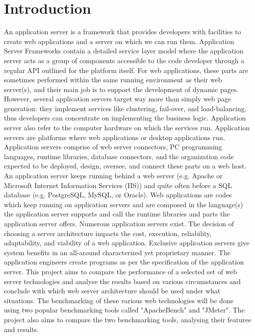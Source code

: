 \documentclass[../thesis.tex]{subfiles}
\begin{document}
\section{Introduction}

\vspace{5mm}
An application server is a framework that provides developers with facilities to create web applications and a server on which we can run them. Application Server Frameworks contain a detailed service layer model where the application server acts as a group of components accessible to the code developer through a regular API outlined for the platform itself. For web applications, these parts are sometimes performed within the same running environment as their web server(s), and their main job is to support the development of dynamic pages. However, several application servers target way more than simply web page generation: they implement services like clustering, fail-over, and load-balancing, thus developers can concentrate on implementing the business logic.
Application server also refer to the computer hardware on which the services run.
\vspace{5mm}
Application servers are platforms where web applications or desktop applications run. Application servers comprise of web server connectors, PC programming languages, runtime libraries, database connectors, and the organization code expected to be deployed, design, oversee, and connect these parts on a web host. An application server keeps running behind a web server (e.g. Apache or Microsoft Internet Information Services (IIS)) and quite often before a SQL database (e.g. PostgreSQL, MySQL, or Oracle). Web applications are codes which keep running on application servers and are composed in the language(s) the application server supports and call the runtime libraries and parts the application server offers.
\vspace{5mm}
Numerous application servers exist. The decision of choosing a server architecture impacts the cost, execution, reliability, adaptability, and viability of a web application. Exclusive application servers give system benefits in an all-around characterized yet proprietary manner. The application engineers create programs as per the specification of the application server. This project aims to compare the performance of a selected set of web server technologies and analyse the results based on various circumstances and conclude with which web server architecture should be used under what situations. The benchmarking of these various web technologies will be done using two popular benchmarking tools called "ApacheBench" and "JMeter". The project also aims to compare the two benchmarking tools, analysing their features and results.
\end{document}
